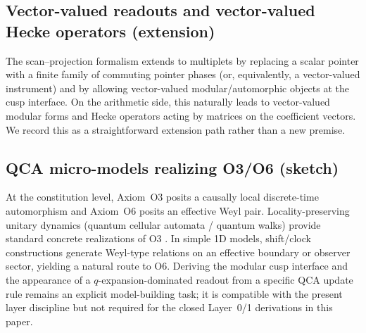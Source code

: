 \subsection{Vector-valued readouts and vector-valued Hecke operators (extension)}
\label{app:vector_valued_readouts}

The scan--projection formalism extends to multiplets by replacing a scalar pointer with a finite family of commuting pointer phases (or, equivalently, a vector-valued instrument) and by allowing vector-valued modular/automorphic objects at the cusp interface.
On the arithmetic side, this naturally leads to vector-valued modular forms and Hecke operators acting by matrices on the coefficient vectors.
We record this as a straightforward extension path rather than a new premise.

\subsection{QCA micro-models realizing \texorpdfstring{O3/O6}{O3/O6} (sketch)}
\label{app:qca_micro_model_sketch}

At the constitution level, Axiom~O3 posits a causally local discrete-time automorphism and Axiom~O6 posits an effective Weyl pair.
Locality-preserving unitary dynamics (quantum cellular automata / quantum walks) provide standard concrete realizations of O3 \cite{Arrighi2019QCAOverview,GrossNesmeVogtsWerner2012}.
In simple 1D models, shift/clock constructions generate Weyl-type relations on an effective boundary or observer sector, yielding a natural route to O6.
Deriving the modular cusp interface and the appearance of a $q$-expansion-dominated readout from a specific QCA update rule remains an explicit model-building task; it is compatible with the present layer discipline but not required for the closed Layer~0/1 derivations in this paper.


